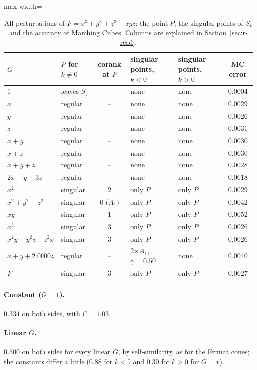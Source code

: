 \documentclass[12pt, a4paper]{article}
\theoremstyle{plain}
\theoremstyle{definition}
\theoremstyle{remark}
\theoremstyle{definition}
\begin{document}
\begin{table}[!h]
\centering
\footnotesize
\begin{adjustbox}{max width=\textwidth}
\begin{tabular}{l l c l l c}
\toprule
$G$ & $P$ for $k\neq0$ & corank at $P$ & singular points, $k<0$ & singular points, $k>0$ & MC error \\
\midrule
$1$ & leaves $S_k$ & -- & none & none & 0.0004 \\
$x$ & regular & -- & none & none & 0.0029 \\
$y$ & regular & -- & none & none & 0.0026 \\
$z$ & regular & -- & none & none & 0.0031 \\
$x+y$ & regular & -- & none & none & 0.0030 \\
$x+z$ & regular & -- & none & none & 0.0030 \\
$x+y+z$ & regular & -- & none & none & 0.0028 \\
$2x-y+3z$ & regular & -- & none & none & 0.0018 \\
$x^2$ & singular & 2 & only $P$ & only $P$ & 0.0029 \\
$x^2+y^2-z^2$ & singular & 0 ($A_1$) & only $P$ & only $P$ & 0.0042 \\
$xy$ & singular & 1 & only $P$ & only $P$ & 0.0052 \\
$x^3$ & singular & 3 & only $P$ & only $P$ & 0.0026 \\
$x^2y+y^2z+z^2x$ & singular & 3 & only $P$ & only $P$ & 0.0026 \\
$x+y+2.0000z$ & regular & -- & 2$\times$$A_1$, $\gamma=0.50$ & none & 0.0040 \\
$F$ & singular & 3 & only $P$ & only $P$ & 0.0027 \\
\bottomrule
\end{tabular}
\end{adjustbox}
\caption[Singular points for $x^3+y^3+z^3+xyz$]{All perturbations of $F=x^3+y^3+z^3+xyz$: the point $P$, the singular points of $S_k$ and the accuracy of Marching Cubes. Columns are explained in Section~\ref{sec:r-read}.}
\label{tab:r-E6c-points}
\end{table}
\paragraph{Constant ($G=1$).} $0.334$ on both sides, with $C=1.03$.

\paragraph{Linear $G$.} $0.500$ on both sides for every linear $G$, by
self-similarity, as for the Fermat cones; the constants differ a little ($0.88$ for
$k<0$ and $0.30$ for $k>0$ for $G=x$).
\end{document}
